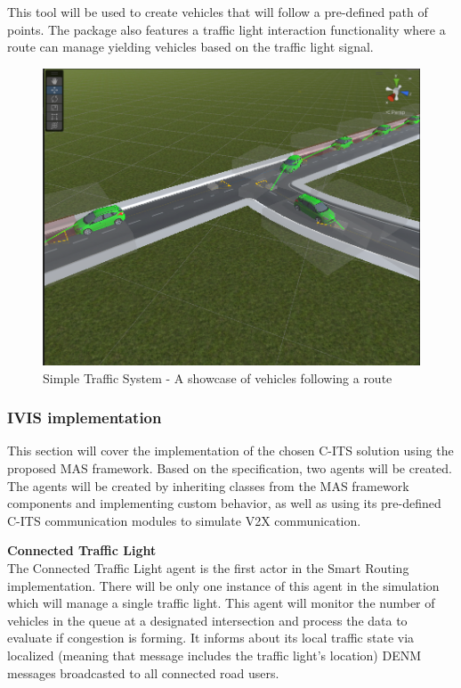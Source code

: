 \documentclass[main.tex]{subfiles}
\begin{document}
This tool will be used to create vehicles that will follow a pre-defined path of points. 
The package also features a traffic light interaction functionality where a route can manage
yielding vehicles based on the traffic light signal. 

\begin{figure}[htbp]
    \centering
    \includegraphics[width=.8\textwidth]{simple-traffic-system.png} 
    \caption{Simple Traffic System - A showcase of vehicles following a route}
    \label{fig-sts}
\end{figure}

\subsubsection{IVIS implementation}\label{sec-implementation}

This section will cover the implementation of the chosen C-ITS solution using the proposed 
MAS framework. Based on the specification, two agents will be created. The agents will be 
created by inheriting classes from the MAS framework components and implementing custom behavior, as 
well as using its pre-defined C-ITS communication modules to simulate V2X communication. 

\textbf{Connected Traffic Light} \smallskip \\
The Connected Traffic Light agent is the first actor in the Smart Routing implementation.
There will be only one instance of this agent in the simulation which will manage a 
single traffic light. This agent will monitor the number of vehicles in the queue at a
designated intersection and process the data to evaluate if congestion is forming. It informs
about its local traffic state via localized (meaning that message includes the traffic light's
location) DENM messages broadcasted to all connected road users.
\end{document}
